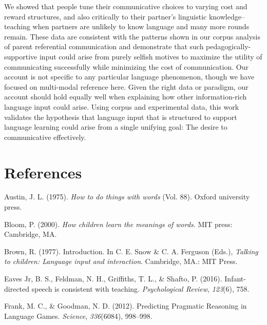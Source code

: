 \documentclass[10pt, letterpaper]{article}
\begin{document}
We showed that people tune their communicative choices to varying cost
and reward structures, and also critically to their partner's linguistic
knowledge--teaching when partners are unlikely to know language and many
more rounds remain. These data are consistent with the patterns shown in
our corpus analysis of parent referential communication and demonstrate
that such pedagogically-supportive input could arise from purely selfish
motives to maximize the utility of communicating successfully while
minimizing the cost of communication. Our account is not specific to any
particular language phenomenon, though we have focused on multi-modal
reference here. Given the right data or paradigm, our account should
hold equally well when explaining how other information-rich language
input could arise. Using corpus and experimental data, this work
validates the hypothesis that language input that is structured to
support language learning could arise from a single unifying goal: The
desire to communicative effectively.

\vspace{1em}

\section{References}\label{references}

\setlength{\parindent}{-0.1in} \setlength{\leftskip}{0.125in}

\noindent

\hypertarget{refs}{}
\hypertarget{ref-austin1975}{}
Austin, J. L. (1975). \emph{How to do things with words} (Vol. 88).
Oxford university press.

\hypertarget{ref-bloom2000}{}
Bloom, P. (2000). \emph{How children learn the meanings of words}. MIT
press: Cambridge, MA.

\hypertarget{ref-brown1977}{}
Brown, R. (1977). Introduction. In C. E. Snow \& C. A. Ferguson (Eds.),
\emph{Talking to children: Language input and interaction}. Cambridge,
MA.: MIT Press.

\hypertarget{ref-eaves-jr2016}{}
Eaves Jr, B. S., Feldman, N. H., Griffiths, T. L., \& Shafto, P. (2016).
Infant-directed speech is consistent with teaching. \emph{Psychological
Review}, \emph{123}(6), 758.

\hypertarget{ref-frank2012}{}
Frank, M. C., \& Goodman, N. D. (2012). Predicting Pragmatic Reasoning
in Language Games. \emph{Science}, \emph{336}(6084), 998--998.
\end{document}
